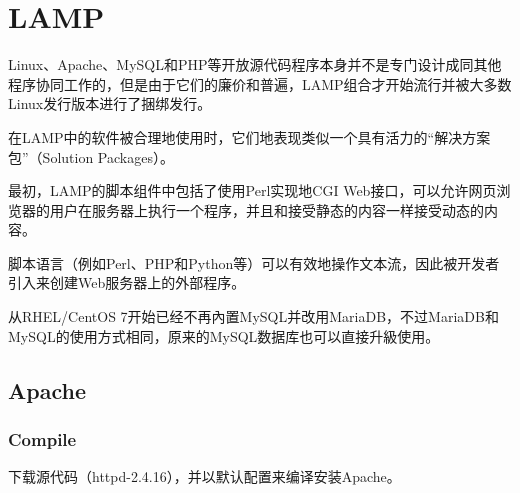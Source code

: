 \begin{lstlisting}[language=PHP]

\end{lstlisting}






\begin{lstlisting}[language=PHP]

\end{lstlisting}




\begin{lstlisting}[language=PHP]

\end{lstlisting}





\chapter{LAMP}


Linux、Apache、MySQL和PHP等开放源代码程序本身并不是专门设计成同其他程序协同工作的，但是由于它们的廉价和普遍，LAMP组合才开始流行并被大多数Linux发行版本进行了捆绑发行。


在LAMP中的软件被合理地使用时，它们地表现类似一个具有活力的“解决方案包”（Solution Packages）。

最初，LAMP的脚本组件中包括了使用Perl实现地CGI Web接口，可以允许网页浏览器的用户在服务器上执行一个程序，并且和接受静态的内容一样接受动态的内容。

脚本语言（例如Perl、PHP和Python等）可以有效地操作文本流，因此被开发者引入来创建Web服务器上的外部程序。

从RHEL/CentOS 7开始已经不再內置MySQL并改用MariaDB，不过MariaDB和MySQL的使用方式相同，原来的MySQL数据库也可以直接升級使用。


\section{Apache}

\subsection{Compile}

下载源代码（httpd-2.4.16），并以默认配置来编译安装Apache。

